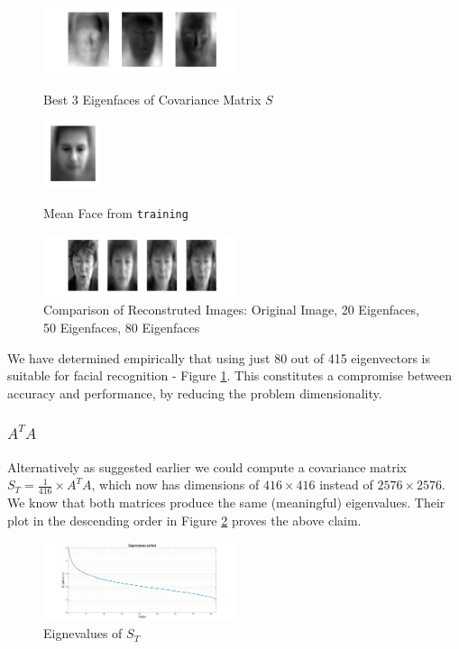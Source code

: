 \documentclass[10pt,twocolumn,letterpaper]{article}
\begin{document}
\begin{figure}[H]

\centering
\includegraphics[width=0.5\textwidth]{../results/Q1A_PCA_Eigenfaces}

  \caption{Best 3 Eigenfaces of Covariance Matrix $S$ \label{fig:Eig2}}

\centering
\includegraphics[width=0.15\textwidth]{../results/Q1A_PCA_Mean}

  \caption{Mean Face from {\tt\small training} \label{fig:Mean}}


\centering
\includegraphics[width=0.5\textwidth]{../results/Q2A_PCA_Reco}

  \caption{Comparison of Reconstruted Images: Original Image, 20 Eigenfaces, 50 Eigenfaces, 80 Eigenfaces \label{fig:Reco}}

\end{figure}


We have determined empirically that using just 80 out of 415 eigenvectors is suitable for facial recognition - Figure \ref{fig:Reco}. This constitutes a compromise between accuracy and performance, by reducing the problem dimensionality.
\subsubsection{\boldmath$A^TA$} \label{sec:ata}
Alternatively as suggested earlier we could compute a covariance matrix $S_T = \frac{1}{416} \times A^TA$, which now has dimensions of $416 \times 416$ instead of $2576 \times 2576$. We know \cite{Data Mining} that both matrices produce the same (meaningful) eigenvalues. Their plot in the  descending order in Figure \ref{fig:Eig3} proves the above claim.

\begin{figure}[H]
\centering
\includegraphics[width=0.5\textwidth]{../results/Q1B_PCA_Eigenvalues}

  \caption{Eignevalues of $S_T$ \label{fig:Eig3}}

\end{figure}
\end{document}
